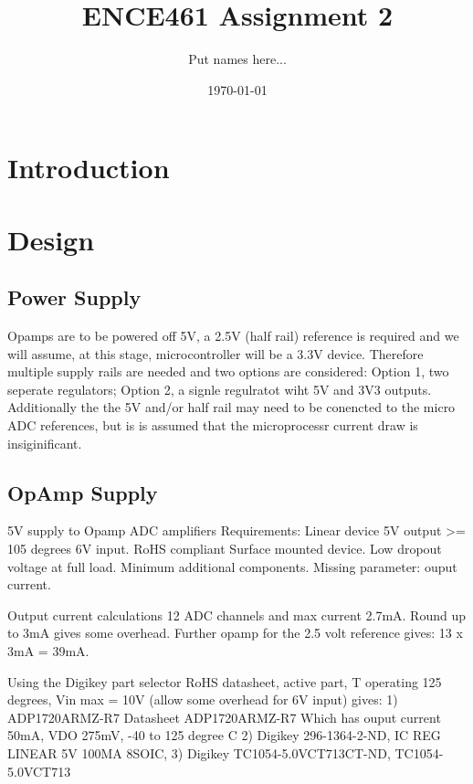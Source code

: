 \documentclass[12pt]{article}
\title{ENCE461 Assignment 2}
\author{Put names here...}
\date{\today}
\begin{document}
\maketitle

\section{Introduction}





\section{Design}



\subsection{Power Supply}
Opamps are to be powered off 5V, a 2.5V (half rail) reference is required and we will assume, at this stage, microcontroller will be a 3.3V device. 
Therefore multiple supply rails are needed and two options are considered: Option 1, two seperate regulators; Option 2, a signle regulratot wiht 5V and 3V3 outputs. 
Additionally the the 5V and/or half rail may need to be conencted to the micro ADC references, but is is assumed that the microprocessr current draw is insiginificant.

\subsection{OpAmp Supply}
5V supply to Opamp ADC amplifiers
Requirements:
Linear device
5V output
>= 105 degrees
6V input.
RoHS compliant
Surface mounted device.
Low dropout voltage at full load. 
Minimum additional components.
Missing parameter: ouput current.

Output current calculations
12 ADC channels and max current 2.7mA. Round up to 3mA gives some overhead.
Further opamp for the 2.5 volt reference gives: 13 x 3mA = 39mA.

Using the Digikey part selector 
RoHS datasheet, active part, T operating 125 degrees, Vin max = 10V (allow some overhead for 6V input) gives:
1)
ADP1720ARMZ-R7
Datasheet ADP1720ARMZ-R7
Which has ouput current 50mA, VDO 275mV, -40 to 125 degree C
2)
Digikey 296-1364-2-ND, IC REG LINEAR 5V 100MA 8SOIC,
3)
Digikey TC1054-5.0VCT713CT-ND, TC1054-5.0VCT713 
\end{document}
